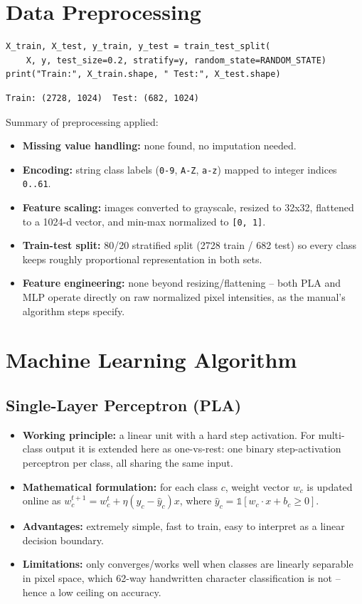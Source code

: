 \documentclass[11pt]{article}
\begin{document}
\section{Data Preprocessing}
\label{sec:org9d9ff6e}

\begin{verbatim}
X_train, X_test, y_train, y_test = train_test_split(
    X, y, test_size=0.2, stratify=y, random_state=RANDOM_STATE)
print("Train:", X_train.shape, " Test:", X_test.shape)
\end{verbatim}

\begin{verbatim}
Train: (2728, 1024)  Test: (682, 1024)
\end{verbatim}


Summary of preprocessing applied:
\begin{itemize}
\item \textbf{Missing value handling:} none found, no imputation needed.
\item \textbf{Encoding:} string class labels (\texttt{0-9}, \texttt{A-Z}, \texttt{a-z}) mapped to integer indices \texttt{0..61}.
\item \textbf{Feature scaling:} images converted to grayscale, resized to 32x32, flattened to a 1024-d
vector, and min-max normalized to \texttt{[0, 1]}.
\item \textbf{Train-test split:} 80/20 stratified split (2728 train / 682 test) so every class keeps
roughly proportional representation in both sets.
\item \textbf{Feature engineering:} none beyond resizing/flattening -- both PLA and MLP operate directly
on raw normalized pixel intensities, as the manual's algorithm steps specify.
\end{itemize}

\section{Machine Learning Algorithm}
\label{sec:org7ec8f3e}

\subsection{Single-Layer Perceptron (PLA)}
\label{sec:orge104aba}
\begin{itemize}
\item \textbf{Working principle:} a linear unit with a hard step activation. For multi-class output it
is extended here as one-vs-rest: one binary step-activation perceptron per class, all
sharing the same input.
\item \textbf{Mathematical formulation:} for each class \(c\), weight vector \(w_c\) is updated online as
\(w_c^{t+1} = w_c^{t} + \eta(y_c - \hat{y}_c)x\), where \(\hat{y}_c = \mathbb{1}[w_c \cdot x +
  b_c \geq 0]\).
\item \textbf{Advantages:} extremely simple, fast to train, easy to interpret as a linear decision
boundary.
\item \textbf{Limitations:} only converges/works well when classes are linearly separable in pixel
space, which 62-way handwritten character classification is not -- hence a low ceiling on
accuracy.
\end{itemize}
\end{document}
